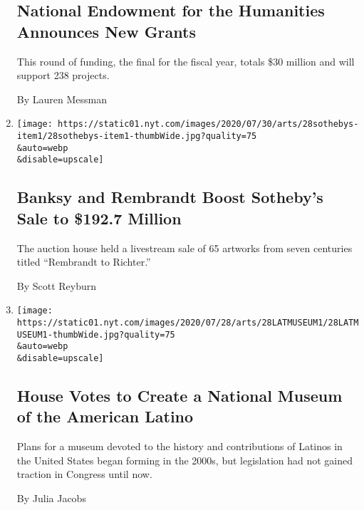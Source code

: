 \begin{enumerate}
  \hypertarget{national-endowment-for-the-humanities-announces-new-grants}{%
  \subsection{National Endowment for the Humanities Announces New
  Grants}\label{national-endowment-for-the-humanities-announces-new-grants}}

  This round of funding, the final for the fiscal year, totals \$30
  million and will support 238 projects.

  By Lauren Messman
\item
  \href{/2020/07/28/arts/design/sothebys-banksy-rembrandt.html}{}

  \texttt{[image: https://static01.nyt.com/images/2020/07/30/arts/28sothebys-item1/28sothebys-item1-thumbWide.jpg?quality=75\\\&auto=webp\\\&disable=upscale]}

  \hypertarget{banksy-and-rembrandt-boost-sothebys-sale-to-1927-million}{%
  \subsection{Banksy and Rembrandt Boost Sotheby's Sale to \$192.7
  Million}\label{banksy-and-rembrandt-boost-sothebys-sale-to-1927-million}}

  The auction house held a livestream sale of 65 artworks from seven
  centuries titled ``Rembrandt to Richter.''

  By Scott Reyburn
\item
  \href{/2020/07/28/arts/design/national-museum-of-the-american-latino.html}{}

  \texttt{[image: https://static01.nyt.com/images/2020/07/28/arts/28LATMUSEUM1/28LATMUSEUM1-thumbWide.jpg?quality=75\\\&auto=webp\\\&disable=upscale]}

  \hypertarget{house-votes-to-create-a-national-museum-of-the-american-latino}{%
  \subsection{House Votes to Create a National Museum of the American
  Latino}\label{house-votes-to-create-a-national-museum-of-the-american-latino}}

  Plans for a museum devoted to the history and contributions of Latinos
  in the United States began forming in the 2000s, but legislation had
  not gained traction in Congress until now.

  By Julia Jacobs
\end{enumerate}

